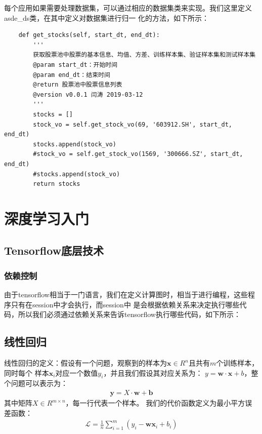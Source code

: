 \documentclass{article}
\begin{document}
每个应用如果需要处理数据集，可以通过相应的数据集类来实现。我们这里定义asde\_ds类，在其中定义对数据集进行归一
化的方法，如下所示：
\begin{lstlisting}
    def get_stocks(self, start_dt, end_dt):
        '''
        获取股票池中股票的基本信息、均值、方差、训练样本集、验证样本集和测试样本集
        @param start_dt：开始时间
        @param end_dt：结束时间
        @return 股票池中股票信息列表
        @version v0.0.1 闫涛 2019-03-12
        '''
        stocks = []
        stock_vo = self.get_stock_vo(69, '603912.SH', start_dt, end_dt)
        stocks.append(stock_vo)
        #stock_vo = self.get_stock_vo(1569, '300666.SZ', start_dt, end_dt)
        #stocks.append(stock_vo)
        return stocks
\end{lstlisting}


















\section{深度学习入门}
\subsection{Tensorflow底层技术}
\subsubsection{依赖控制}
由于tensorflow相当于一门语言，我们在定义计算图时，相当于进行编程，这些程序只有在session中才会执行，而session中
是会根据依赖关系来决定执行哪些代码，所以我们必须通过依赖关系来告诉tensorflow执行哪些代码，如下所示：
\subsection{线性回归}
线性回归的定义：假设有一个问题，观察到的样本为$\boldsymbol{x} \in R^{n}$且共有$m$个训练样本，同时每个
样本$\boldsymbol{x}_{i}$对应一个数值$y_{i}$，并且我们假设其对应关系为：
$y=\boldsymbol{w} \cdot \boldsymbol{x}+b$，整个问题可以表示为：
\begin{equation}
    \begin{aligned}
        \boldsymbol{y} = X \cdot \boldsymbol{w} + \boldsymbol{b}
    \end{aligned}
    \label{e000001}
\end{equation}
其中矩阵$X \in R^{m \times n}$，每一行代表一个样本。\newline
我们的代价函数定义为最小平方误差函数：
\begin{equation}
    \begin{aligned}
        \mathcal{L}=\frac{1}{n}\sum_{i=1}^{m}(y_{i} - \boldsymbol{w} \boldsymbol{x}_{i} + b_{i})
    \end{aligned}
    \label{e000002}
\end{equation}
\end{document}
